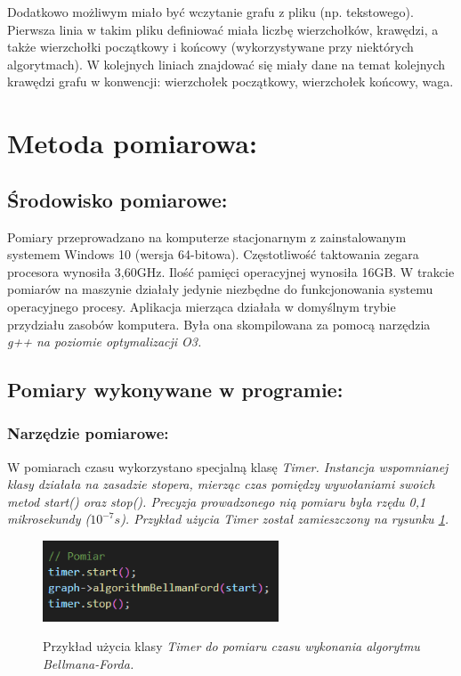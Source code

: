 \documentclass[a4paper,12pt]{article}
\begin{document}
\noindent
Dodatkowo możliwym miało być wczytanie grafu z pliku (np. tekstowego). Pierwsza linia w takim pliku definiować miała liczbę wierzchołków, krawędzi, a także wierzchołki początkowy i końcowy (wykorzystywane przy niektórych algorytmach). W kolejnych liniach znajdować się miały dane na temat kolejnych krawędzi grafu w konwencji: wierzchołek początkowy, wierzchołek końcowy, waga.

\section{Metoda pomiarowa:}

\subsection{Środowisko pomiarowe:}
Pomiary przeprowadzano na komputerze stacjonarnym z zainstalowanym systemem Windows 10 (wersja 64-bitowa). Częstotliwość taktowania zegara procesora wynosiła 3,60GHz. Ilość pamięci operacyjnej wynosiła 16GB. W trakcie pomiarów na maszynie działały jedynie niezbędne do funkcjonowania systemu operacyjnego procesy. Aplikacja mierząca działała w domyślnym trybie przydziału zasobów komputera. Była ona skompilowana za pomocą narzędzia \it g++ \rm na poziomie optymalizacji O3. 

\subsection{Pomiary wykonywane w programie:}

\subsubsection{Narzędzie pomiarowe:}
W pomiarach czasu wykorzystano specjalną klasę \it Timer\rm. Instancja wspomnianej klasy działała na zasadzie stopera, mierząc czas pomiędzy wywołaniami swoich metod \it start() \rm oraz \it stop()\rm. Precyzja prowadzonego nią pomiaru była rzędu 0,1 mikrosekundy ($10^{-7}s$). Przykład użycia \it Timer \rm został zamieszczony na rysunku \ref{fig.timer-przyklad}.
\begin{figure}[H]
	\centering
	\caption{\centering Przykład użycia klasy \it Timer \rm do pomiaru czasu wykonania algorytmu Bellmana-Forda.}
	\includegraphics[width=7cm]{fig2.png}
	\label{fig.timer-przyklad}
\end{figure}
\end{document}
